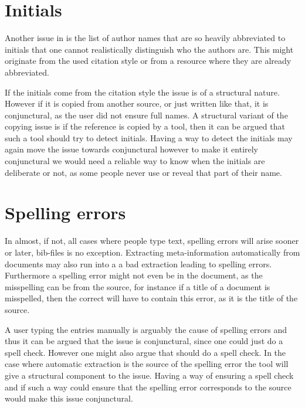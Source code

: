 \section{Initials}
\label{sec:problems_initials}

Another issue in  is the list of author
names that are so heavily abbreviated to initials that one cannot
realistically distinguish who the authors are.  This might originate
from the used citation style or from a resource where they are already
abbreviated.

If the initials come from the citation style the issue is of a
structural nature.  However if it is copied from another source, or
just written like that, it is conjunctural, as the user did not ensure
full names.  A structural variant of the copying issue is if the
reference is copied by a tool, then it can be argued that such a tool
should try to detect initials.  Having a way to detect the initials
may again move the issue towards conjunctural however to make it
entirely conjunctural we would need a reliable way to know when the
initials are deliberate or not, as some people never use or reveal
that part of their name.


\section{Spelling errors}
\label{sec:problems_spelling}

In almost, if not, all cases where people type text, spelling errors
will arise sooner or later, bib-files is no exception.  Extracting
meta-information automatically from documents may also run into a a
bad extraction leading to spelling errors.  Furthermore a spelling
error might not even be in the {\bibtex} document, as the misspelling
can be from the source, for instance if a title of a document is
misspelled, then the correct {\bibtex} will have to contain this
error, as it is the title of the source.

A user typing the entries manually is arguably the cause of spelling
errors and thus it can be argued that the issue is conjunctural, since
one could just do a spell check.  However one might also argue that
{\bibtex} should do a spell check.  In the case where automatic
extraction is the source of the spelling error the tool will give a
structural component to the issue.  Having a way of ensuring a spell
check and if such a way could ensure that the spelling error
corresponds to the source would make this issue conjunctural.


